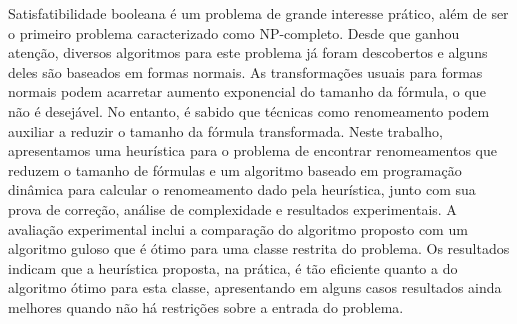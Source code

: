 Satisfatibilidade booleana é um problema de grande interesse prático, além de ser o primeiro problema caracterizado como NP-completo. Desde que ganhou atenção, diversos algoritmos para este problema já foram descobertos e alguns deles são baseados em formas normais. As transformações usuais para formas normais podem acarretar aumento exponencial do tamanho da fórmula, o que não é desejável. No entanto, é sabido que técnicas como renomeamento podem auxiliar a reduzir o tamanho da fórmula transformada. Neste trabalho, apresentamos uma heurística para o problema de encontrar renomeamentos que reduzem o tamanho de fórmulas e um algoritmo baseado em programação dinâmica para calcular o renomeamento dado pela heurística, junto com sua prova de correção, análise de complexidade e resultados experimentais. A avaliação experimental inclui a comparação do algoritmo proposto com um algoritmo guloso que é ótimo para uma classe restrita do problema. Os resultados indicam que a heurística proposta, na prática, é tão eficiente quanto a do algoritmo ótimo para esta classe, apresentando em alguns casos resultados ainda melhores quando não há restrições sobre a entrada do problema.
